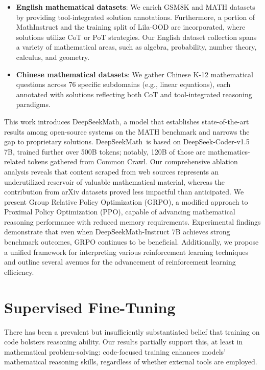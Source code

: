 \begin{itemize}[topsep=0pt]
\begin{itemize}[topsep=0pt]
    \item \textbf{English mathematical datasets}: We enrich GSM8K and MATH datasets by providing tool-integrated solution annotations. Furthermore, a portion of MathInstruct \citep{MathInstruct} and the training split of Lila-OOD \citep{lila} are incorporated, where solutions utilize CoT or PoT strategies. Our English dataset collection spans a variety of mathematical areas, such as algebra, probability, number theory, calculus, and geometry.
    \item \textbf{Chinese mathematical datasets}: We gather Chinese K-12 mathematical questions across 76 specific subdomains (e.g., linear equations), each annotated with solutions reflecting both CoT and tool-integrated reasoning paradigms.
\end{itemize}

This work introduces DeepSeekMath, a model that establishes state-of-the-art results among open-source systems on the MATH benchmark and narrows the gap to proprietary solutions. DeepSeekMath~is based on DeepSeek-Coder-v1.5 7B, trained further over 500B tokens; notably, 120B of those are mathematics-related tokens gathered from Common Crawl. Our comprehensive ablation analysis reveals that content scraped from web sources represents an underutilized reservoir of valuable mathematical material, whereas the contribution from arXiv datasets proved less impactful than anticipated. We present Group Relative Policy Optimization (GRPO), a modified approach to Proximal Policy Optimization (PPO), capable of advancing mathematical reasoning performance with reduced memory requirements. Experimental findings demonstrate that even when DeepSeekMath-Instruct 7B achieves strong benchmark outcomes, GRPO continues to be beneficial. Additionally, we propose a unified framework for interpreting various reinforcement learning techniques and outline several avenues for the advancement of reinforcement learning efficiency.

\section{Supervised Fine-Tuning}

There has been a prevalent but insufficiently substantiated belief that training on code bolsters reasoning ability. Our results partially support this, at least in mathematical problem-solving: code-focused training enhances models’ mathematical reasoning skills, regardless of whether external tools are employed.


\end{itemize}
